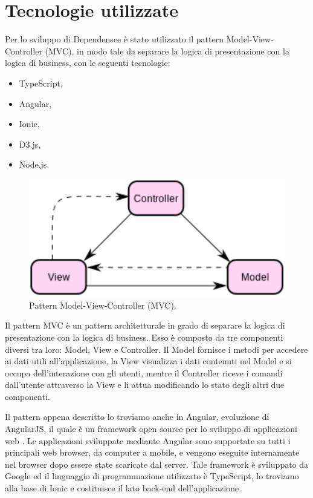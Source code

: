\section{Tecnologie utilizzate}\label{tecnologie}
Per lo sviluppo di Dependensee \`{e} stato utilizzato il pattern Model-View-Controller (MVC), in modo tale da separare la logica di presentazione con la logica di business, con le seguenti tecnologie:
\begin{itemize}
    \item TypeScript,
    \item Angular,
    \item Ionic,
    \item D3.js,
    \item Node.js.
\end{itemize}
\begin{figure}[ht]
    \centering
    \includegraphics[width=.5\columnwidth]{capitoli/figure/mvc}
    \caption{Pattern Model-View-Controller (MVC).}
    \label{fig:pattern_mvc}
\end{figure}
Il pattern MVC \`{e} un pattern architetturale in grado di separare la logica di presentazione con la logica di business. Esso \`{e} composto da tre componenti diversi tra loro: Model, View e Controller.
Il Model fornisce i metodi per accedere ai dati utili all'applicazione, la View visualizza i dati contenuti nel Model e si occupa dell'interazione con gli utenti, mentre il Controller riceve i comandi dall'utente attraverso la View e li attua modificando lo stato degli altri due componenti.\par
Il pattern appena descritto lo troviamo anche in Angular, evoluzione di AngularJS, il quale \`{e} un framework open source per lo sviluppo di applicazioni web \cite{angular}. Le applicazioni sviluppate mediante Angular sono supportate su tutti i principali web browser, da computer a mobile, e vengono eseguite internamente nel browser dopo essere state scaricate dal server. Tale framework \`{e} sviluppato da Google ed il linguaggio di programmazione utilizzato \`{e} TypeScript, lo troviamo alla base di Ionic e costituisce il lato back-end dell'applicazione.\par
